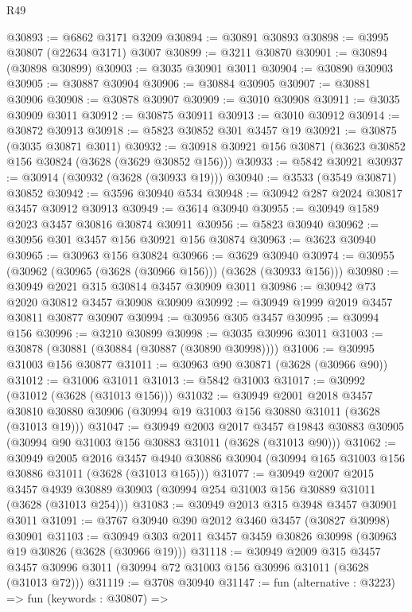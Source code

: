 \begin{lexlean}{R49}
\begin{coremodule}
@30893 := @6862 @3171 @3209
@30894 := @30891 @30893
@30898 := @3995 @30807 (@22634 @3171) @3007
@30899 := @3211 @30870
@30901 := @30894 (@30898 @30899)
@30903 := @3035 @30901 @3011
@30904 := @30890 @30903
@30905 := @30887 @30904
@30906 := @30884 @30905
@30907 := @30881 @30906
@30908 := @30878 @30907
@30909 := @3010 @30908
@30911 := @3035 @30909 @3011
@30912 := @30875 @30911
@30913 := @3010 @30912
@30914 := @30872 @30913
@30918 := @5823 @30852 @301 @3457 @19
@30921 := @30875 (@3035 @30871 @3011)
@30932 := @30918 @30921 @156 @30871 (@3623 @30852 @156 @30824 (@3628 (@3629 @30852 @156)))
@30933 := @5842 @30921
@30937 := @30914 (@30932 (@3628 (@30933 @19)))
@30940 := @3533 (@3549 @30871) @30852
@30942 := @3596 @30940 @534
@30948 := @30942 @287 @2024 @30817 @3457 @30912 @30913
@30949 := @3614 @30940
@30955 := @30949 @1589 @2023 @3457 @30816 @30874 @30911
@30956 := @5823 @30940
@30962 := @30956 @301 @3457 @156 @30921 @156 @30874
@30963 := @3623 @30940
@30965 := @30963 @156 @30824
@30966 := @3629 @30940
@30974 := @30955 (@30962 (@30965 (@3628 (@30966 @156))) (@3628 (@30933 @156)))
@30980 := @30949 @2021 @315 @30814 @3457 @30909 @3011
@30986 := @30942 @73 @2020 @30812 @3457 @30908 @30909
@30992 := @30949 @1999 @2019 @3457 @30811 @30877 @30907
@30994 := @30956 @305 @3457
@30995 := @30994 @156
@30996 := @3210 @30899
@30998 := @3035 @30996 @3011
@31003 := @30878 (@30881 (@30884 (@30887 (@30890 @30998))))
@31006 := @30995 @31003 @156 @30877
@31011 := @30963 @90 @30871 (@3628 (@30966 @90))
@31012 := @31006 @31011
@31013 := @5842 @31003
@31017 := @30992 (@31012 (@3628 (@31013 @156)))
@31032 := @30949
    @2001
    @2018
    @3457
    @30810
    @30880
    @30906
    (@30994 @19 @31003 @156 @30880 @31011 (@3628 (@31013 @19)))
@31047 := @30949
    @2003
    @2017
    @3457
    @19843
    @30883
    @30905
    (@30994 @90 @31003 @156 @30883 @31011 (@3628 (@31013 @90)))
@31062 := @30949
    @2005
    @2016
    @3457
    @4940
    @30886
    @30904
    (@30994 @165 @31003 @156 @30886 @31011 (@3628 (@31013 @165)))
@31077 := @30949
    @2007
    @2015
    @3457
    @4939
    @30889
    @30903
    (@30994 @254 @31003 @156 @30889 @31011 (@3628 (@31013 @254)))
@31083 := @30949 @2013 @315 @3948 @3457 @30901 @3011
@31091 := @3767 @30940 @390 @2012 @3460 @3457 (@30827 @30998) @30901
@31103 := @30949 @303 @2011 @3457 @3459 @30826 @30998 (@30963 @19 @30826 (@3628 (@30966 @19)))
@31118 := @30949
    @2009
    @315
    @3457
    @3457
    @30996
    @3011
    (@30994 @72 @31003 @156 @30996 @31011 (@3628 (@31013 @72)))
@31119 := @3708 @30940
@31147 := fun (alternative : @3223) =>
  fun (keywords : @30807) =>

\end{coremodule}
\end{lexlean}
